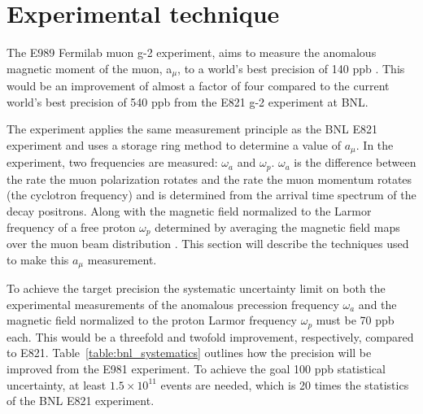 
\chapter{Experimental technique} %

\label{Chapter2} %

The E989 Fermilab muon g-2 experiment, aims to measure the anomalous magnetic moment of the muon, a$_{\mu}$, to a world’s best precision of 140 ppb \cite{Reference13}. This would be an improvement of almost a factor of four compared to the current world's best precision of 540 ppb from the E821 g-2 experiment at BNL.

The experiment applies the same measurement principle as the BNL E821 experiment and uses a storage ring method to determine a value of $a_{\mu}$. In the experiment, two frequencies are measured: $\omega_a$ and $\omega_p$. $\omega_a$ is the difference between the rate the muon polarization rotates and the rate the muon momentum rotates (the cyclotron frequency) and is determined from the arrival time spectrum of the decay positrons. Along with the magnetic field normalized to the Larmor frequency of a free proton $\omega_{p}$ determined by averaging the magnetic field maps over the muon beam distribution \cite{Reference23}. This section will describe the techniques used to make this $a_{\mu}$ measurement. 

To achieve the target precision the systematic uncertainty limit on both the experimental measurements of the anomalous precession frequency $\omega_{a}$ and the magnetic field normalized to the proton Larmor frequency $\omega_{p}$ must be 70 ppb each. This would be a threefold and twofold improvement, respectively, compared to E821. Table~\ref{table:bnl_systematics} outlines how the precision will be improved from the E981 experiment. To achieve the goal 100 ppb statistical uncertainty, at least $1.5\times{10^{11}}$ events are needed, which is 20 times the statistics of the BNL E821 experiment.  

